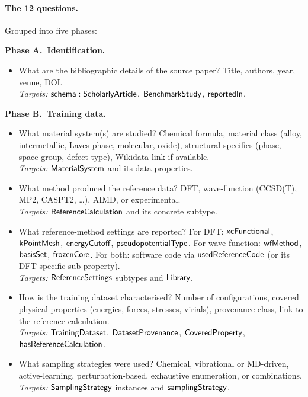 \paragraph{The 12 questions.}
Grouped into five phases:

\smallskip
\noindent\textbf{Phase A.\ Identification.}
\begin{itemize}
\item[Q1.] What are the bibliographic details of the source paper?
  Title, authors, year, venue, DOI.
  \\ \emph{Targets:} $\mathsf{schema:ScholarlyArticle}$,
  $\mathsf{BenchmarkStudy}$, $\mathsf{reportedIn}$.
\end{itemize}

\smallskip
\noindent\textbf{Phase B.\ Training data.}
\begin{itemize}
\item[Q2.] What material system(s) are studied? Chemical formula,
  material class (alloy, intermetallic, Laves phase, molecular,
  oxide), structural specifics (phase, space group, defect type),
  Wikidata link if available.
  \\ \emph{Targets:} $\mathsf{MaterialSystem}$ and its data properties.
\item[Q3.] What method produced the reference data? DFT,
  wave-function (CCSD(T), MP2, CASPT2, \dots), AIMD, or experimental.
  \\ \emph{Targets:} $\mathsf{ReferenceCalculation}$ and its concrete
  subtype.
\item[Q4.] What reference-method settings are reported? For DFT:
  $\mathsf{xcFunctional}$, $\mathsf{kPointMesh}$, $\mathsf{energyCutoff}$,
  $\mathsf{pseudopotentialType}$. For wave-function: $\mathsf{wfMethod}$,
  $\mathsf{basisSet}$, $\mathsf{frozenCore}$. For both: software code via
  $\mathsf{usedReferenceCode}$ (or its DFT-specific sub-property).
  \\ \emph{Targets:} $\mathsf{ReferenceSettings}$ subtypes and $\mathsf{Library}$.
\item[Q5.] How is the training dataset characterised? Number of
  configurations, covered physical properties (energies, forces,
  stresses, virials), provenance class, link to the reference
  calculation.
  \\ \emph{Targets:} $\mathsf{TrainingDataset}$, $\mathsf{DatasetProvenance}$,
  $\mathsf{CoveredProperty}$, $\mathsf{hasReferenceCalculation}$.
\item[Q6.] What sampling strategies were used? Chemical, vibrational
  or MD-driven, active-learning, perturbation-based, exhaustive
  enumeration, or combinations.
  \\ \emph{Targets:} $\mathsf{SamplingStrategy}$ instances and
  $\mathsf{samplingStrategy}$.
\end{itemize}

